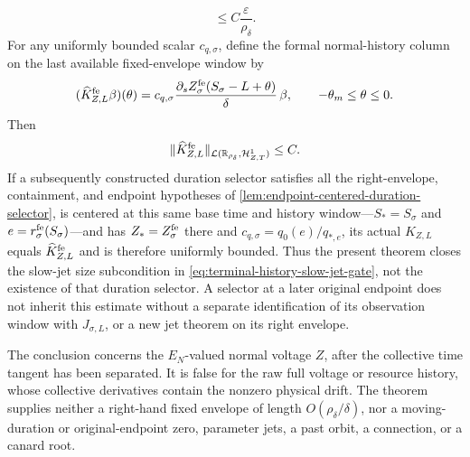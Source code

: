 \begin{theorem}
\begin{equation}
 \le C\frac{\varepsilon}{\rho_\delta}.         \label{eq:fixed-envelope-terminal-slow-jet}
\end{equation}
For any uniformly bounded scalar \(c_{q,\sigma}\), define the formal
normal-history column on the last available fixed-envelope window by
\begin{equation}
 (\widehat K_{Z,L}^{\rm fe}\beta)(\theta)
 =c_{q,\sigma}\frac{\partial_sZ_\sigma^{\rm fe}
       (S_\sigma-L+\theta)}{\delta}\,\beta,
 \qquad-\theta_m\le\theta\le0.                  \label{eq:fixed-envelope-formal-history-column}
\end{equation}
Then
\begin{equation}
 \|\widehat K_{Z,L}^{\rm fe}\|_
       {\mathcal L(\mathbb R_{\rho_\delta},
                \mathcal H_{Z,T}^1)}\le C.       \label{eq:fixed-envelope-history-shear-bound}
\end{equation}
If a subsequently constructed duration selector satisfies all the right-envelope, containment,
and endpoint hypotheses of
\cref{lem:endpoint-centered-duration-selector}, is centered at this same
base time and history window---\(S_*=S_\sigma\) and
\(e=r_\sigma^{\rm fe}(S_\sigma)\)---and has
\(Z_*=Z_\sigma^{\rm fe}\) there and
\(c_{q,\sigma}=q_0(e)/q_{*,e}\), its actual \(K_{Z,L}\) equals
\(\widehat K_{Z,L}^{\rm fe}\) and is therefore uniformly bounded.  Thus the
present theorem closes the slow-jet size subcondition in
\cref{eq:terminal-history-slow-jet-gate}, not the existence of that
duration selector.  A selector at a later original endpoint does not inherit
this estimate without a separate identification of its observation window
with \(J_{\sigma,L}\), or a new jet theorem on its right envelope.

The conclusion concerns the \(E_N\)-valued normal voltage \(Z\), after the
collective time tangent has been separated.  It is false for the raw full
voltage or resource history, whose collective derivatives contain the
nonzero physical drift.  The theorem supplies neither a right-hand
fixed envelope of length \(O(\rho_\delta/\delta)\), nor a moving-duration
or original-endpoint zero, parameter jets, a past orbit, a connection, or
a canard root.
\end{theorem}

